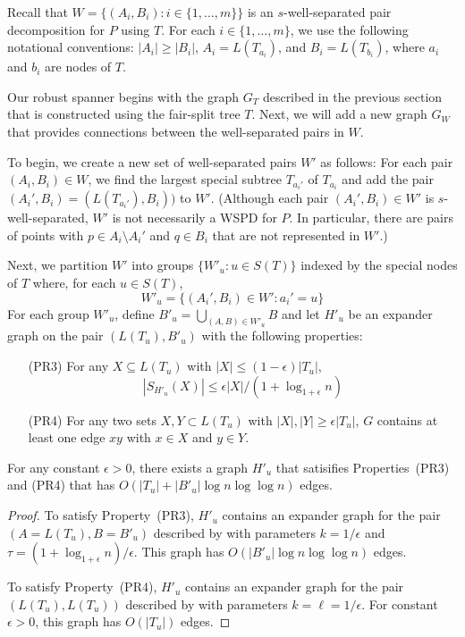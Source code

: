 \documentclass{patmorin}
\begin{document}
Recall that $W=\{(A_i,B_i):i\in\{1,\ldots,m\}\}$ is an $s$-well-separated
pair decomposition for $P$ using $T$. For each $i\in\{1,\ldots,m\}$,
we use the following notational conventions:  $|A_i|\ge |B_i|$,
$A_i=L(T_{a_i})$, and $B_i=L(T_{b_i})$, where $a_i$ and $b_i$ are nodes
of $T$.

Our robust spanner begins with the graph $G_T$ described in the
previous section that is constructed using the fair-split tree $T$.
Next, we will add a new graph $G_W$ that provides connections between
the well-separated pairs in $W$.

To begin, we create a new set of well-separated pairs $W'$ as follows:
For each pair $(A_i,B_i)\in W$, we find the largest special subtree
$T_{a_i'}$ of $T_{a_i}$ and add the pair $(A_i',B_i)=(L(T_{a_i'}),B_i))$
to $W'$.  (Although each pair $(A_i',B_i)\in W'$ is $s$-well-separated,
$W'$ is not necessarily a WSPD for $P$.  In particular, there are pairs
of points with $p\in A_i\setminus A_i'$ and $q\in B_i$ that
are not represented in $W'$.)

Next, we partition $W'$ into groups $\{W'_u: u\in S(T)\}$ indexed by
the special nodes of $T$ where, for each $u\in S(T)$,
\[
	W'_u = \{ (A_i',B_i)\in W' : a_i' = u \}
\]
For each group $W'_u$, define $B'_u=\bigcup_{(A,B)\in W'_u} B$
and let $H'_u$ be an expander graph on the pair $(L(T_u), B'_u)$ with
the following properties:
\begin{enumerate}
  \item[(PR3)] For any $X\subseteq L(T_u)$ with $|X|\le
  (1-\epsilon)|T_u|$, 
   \[ |S_{H'_u}(X)| \le \epsilon|X|/(1+\log_{1+\epsilon} n) \]
%
  \item[(PR4)] For any two sets $X,Y\subset L(T_u)$ with $|X|,|Y|\ge
  \epsilon|T_u|$, $G$ contains at least one edge $xy$ with $x\in X$
  and $y\in Y$.
\end{enumerate}

\begin{clm}
  For any constant $\epsilon >0$, there exists a graph $H'_u$ that
  satisifies Properties~(PR3) and (PR4) that has $O(|T_u|+|B'_u|\log
  n\log\log n)$ edges.
\end{clm}

\begin{proof}
  To satisfy Property~(PR3), $H'_u$ contains an expander graph for the
  pair $(A=L(T_u),B=B'_u)$ described by  with parameters
  $k=1/\epsilon$ and $\tau=(1+\log_{1+\epsilon} n)/\epsilon$.  
  This graph has $O(|B'_u|\log n\log\log n)$ edges.

  To satisfy Property~(PR4), $H'_u$ contains an expander graph for the
  pair $(L(T_u),L(T_u))$ described by  with parameters
  $k=\ell=1/\epsilon$.  For constant $\epsilon >0$, this graph has 
  $O(|T_u|)$ edges.
\end{proof}
\end{document}
